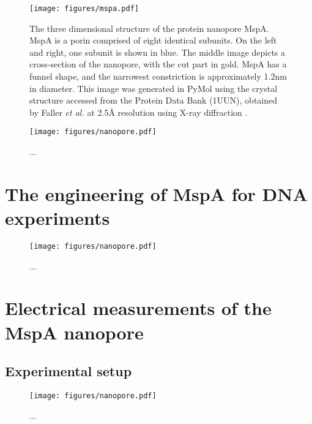 \begin{figure}[h]
\begin{centering}
\texttt{[image: figures/mspa.pdf]}
\caption[The protein nanopore MspA]{The three dimensional structure of the protein nanopore MspA.  MspA is a porin comprised of eight identical subunits.  On the left and right, one subunit is shown in blue.  The middle image depicts a cross-section of the nanopore, with the cut part in gold.  MspA has a funnel shape, and the narrowest constriction is approximately 1.2nm in diameter.  This image was generated in PyMol using the crystal structure accessed from the Protein Data Bank (1UUN), obtained by Faller \textit{et al.} at 2.5\AA $ $ resolution using X-ray diffraction \citep{Faller2004a}.}
\label{fig:mspa}
\end{centering}
\end{figure}

\begin{figure}[h]
\begin{centering}
\texttt{[image: figures/nanopore.pdf]}
\caption[Lipids and the lipid bilayer membrane]{...}
\label{fig:lipids}
\end{centering}
\end{figure}

\section{The engineering of MspA for DNA experiments}

\begin{figure}[h]
\begin{centering}
\texttt{[image: figures/nanopore.pdf]}
\caption[Genetic engineering of MspA]{...}
\label{fig:mspa_engineering}
\end{centering}
\end{figure}

\section{Electrical measurements of the MspA nanopore}

\subsection{Experimental setup}

\begin{figure}[h]
\begin{centering}
\texttt{[image: figures/nanopore.pdf]}
\caption[Experimental setup]{...}
\label{fig:setup}
\end{centering}
\end{figure}

